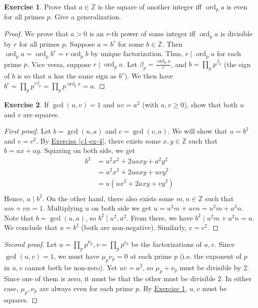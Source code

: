 \documentclass{article}
\theoremstyle{definition}
\newtheorem{exercise}{Exercise}
\begin{document}
\newpage

\begin{exercise} \label{c1-ex-15}
Prove that $a \in \mathbb{Z}$ is the square of another integer iff $\operatorname{ord}_p a$ is even for all primes $p$. Give a generalization.
\end{exercise}
\begin{proof}
We prove that $a > 0$ is an $r$-th power of some integer iff $\operatorname{ord}_p a$ is divisible by $r$ for all primes $p$. Suppose $a = b^r$ for some $b \in \mathbb{Z}$. Then $\operatorname{ord}_p a = \operatorname{ord}_p b^r = r \operatorname{ord}_p b$ by unique factorization. Thus, $r \mid \operatorname{ord}_p a$ for each prime $p$. Vice versa, suppose $r \mid \operatorname{ord}_p a$. Let $\beta_p = \frac{\operatorname{ord}_p a}{r}$, and $b = \prod_p p^{\beta_p}$ (the sign of $b$ is so that $a$ has the same sign as $b^r$). We then have $b^r = \prod_p p^{r \beta_p} = \prod_p p^{\operatorname{ord}_p a} = a$.
\end{proof}

\newpage

\begin{exercise} \label{c1-ex-16}
If $\gcd(u, v) = 1$ and $uv = a^2$ (with $u, v \geq 0$), show that both $u$ and $v$ are squares.
\end{exercise}
\begin{proof}[First proof]
Let $b = \gcd(u, a)$ and $c = \gcd(v, a)$. We will show that $u = b^2$ and $v = c^2$. By \hyperref[c1-ex-4]{Exercise \ref*{c1-ex-4}}, there exists some $x, y \in \mathbb{Z}$ such that $b = ux + ay$. Squaring on both side, we get
\begin{align*}
b^2 & = u^2 x^2 + 2uaxy + a^2 y^2 \\
& = u^2 x^2 + 2uaxy + uvy^2 \\
& = u(ux^2 + 2axy + vy^2) \\
\end{align*}
Hence, $u \mid b^2$. On the other hand, there also exists some $m,n \in \mathbb{Z}$ such that $um + vn = 1$. Multiplying $u$ on both side we get $u = u^2 m + uv n = u^2 m + a^2 n$. Note that $b = \gcd(u, a)$, so $b^2 \mid u^2, a^2$. From there, we have $b^2 \mid u^2 m + a^2 n = u$. We conclude that $u = b^2$ (both are non-negative). Similarly, $v = c^2$.
\end{proof}
\begin{proof}[Second proof]
Let $u = \prod_p p^{\mu_p}, v = \prod_p p^{\nu_p}$ be the factorizations of $u, v$. Since $\gcd(u, v) = 1$, we must have $\mu_p \nu_p = 0$ at each prime $p$ (i.e. the exponent of $p$ in $u, v$ cannot both be non-zero). Yet $uv = a^2$, so $\mu_p + \nu_p$ must be divisible by $2$. Since one of them is zero, it must be that the other must be divisible $2$. In either case, $\mu_p, \nu_p$ are always even for each prime $p$. By \hyperref[c1-ex-15]{Exercise \ref*{c1-ex-15}}, $u, v$ must be squares.
\end{proof}
\end{document}
